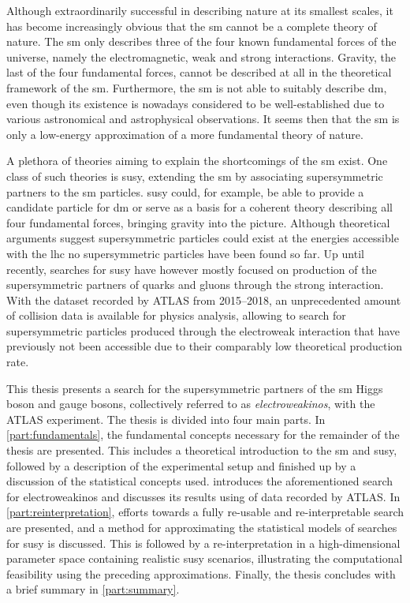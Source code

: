 Although extraordinarily successful in describing nature at its smallest scales, it has become increasingly obvious that the \gls{sm} cannot be a complete theory of nature. The \gls{sm} only describes three of the four known fundamental forces of the universe, namely the electromagnetic, weak and strong interactions. Gravity, the last of the four fundamental forces, cannot be described at all in the theoretical framework of the \gls{sm}. Furthermore, the \gls{sm} is not able to suitably describe \gls{dm}, even though its existence is nowadays considered to be well-established due to various astronomical and astrophysical observations. It seems then that the \gls{sm} is only a low-energy approximation of a more fundamental theory of nature.

A plethora of theories aiming to explain the shortcomings of the \gls{sm} exist. One class of such theories is \gls{susy}, extending the \gls{sm} by associating supersymmetric partners to the \gls{sm} particles. \gls{susy} could, for example, be able to provide a candidate particle for \gls{dm} or serve as a basis for a coherent theory describing all four fundamental forces, \ie bringing gravity into the picture. Although theoretical arguments suggest supersymmetric particles could exist at the energies accessible with the \gls{lhc} no supersymmetric particles have been found so far. Up until recently, searches for \gls{susy} have however mostly focused on production of the supersymmetric partners of quarks and gluons through the strong interaction. With the dataset recorded by ATLAS from 2015--2018, an unprecedented amount of collision data is available for physics analysis, allowing to search for supersymmetric particles produced through the electroweak interaction that have previously not been accessible due to their comparably low theoretical production rate.

This thesis presents a search for the supersymmetric partners of the \gls{sm} Higgs boson and gauge bosons, collectively referred to as \textit{electroweakinos}, with the ATLAS experiment. The thesis is divided into four main parts. In \cref{part:fundamentals}, the fundamental concepts necessary for the remainder of the thesis are presented. This includes a theoretical introduction to the \gls{sm} and \gls{susy}, followed by a description of the experimental setup and finished up by a discussion of the statistical concepts used.  introduces the aforementioned search for electroweakinos and discusses its results using \onethirtynineifb of data recorded by ATLAS. In \cref{part:reinterpretation}, efforts towards a fully re-usable and re-interpretable search are presented, and a method for approximating the statistical models of searches for \gls{susy} is discussed. This is followed by a re-interpretation in a high-dimensional parameter space containing realistic \gls{susy} scenarios, illustrating the computational feasibility using the preceding approximations. Finally, the thesis concludes with a brief summary in \cref{part:summary}.

